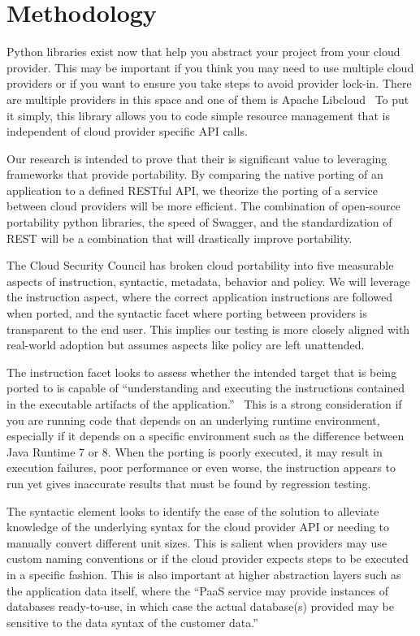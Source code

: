 \section{Methodology}

Python libraries exist now that help you abstract your project from  your cloud provider. 
This may be important if you think you may need to use multiple cloud providers or if you 
want to ensure you take steps to avoid provider lock-in. There are multiple providers in 
this space and one of them is Apache Libcloud~\cite{hid-sp18-518-LibCloud} To put it 
simply, this library allows you to code simple resource  management that is independent 
of cloud provider specific API calls.

Our research is intended to prove that their is significant value to leveraging 
frameworks that provide portability. By comparing the native porting of an application to
a defined RESTful API, we theorize the porting of a service between cloud providers will
be more efficient. The combination of open-source portability python libraries, the speed 
of Swagger, and the standardization of REST will be a combination that will drastically
improve portability.

The Cloud Security Council has broken cloud portability into five measurable aspects of 
instruction, syntactic, metadata, behavior and policy. We will leverage the instruction
aspect, where the correct application instructions are followed when ported, and the 
syntactic facet where porting between providers is transparent to the end user. This
implies our testing is more closely aligned with real-world adoption but assumes aspects
like policy are left unattended.~\cite{hid-sp18-518-Cloud-Council}

The instruction facet looks to assess whether the intended target that is being ported to 
is capable of ``understanding and executing the instructions contained in the executable 
artifacts of the application.''~\cite{hid-sp18-518-Cloud-Council} This is a strong 
consideration if you are running code that depends on an underlying runtime environment, 
especially if it depends on a specific environment such as the difference between Java 
Runtime 7 or 8. When the porting is poorly executed, it may result in execution failures, 
poor performance or even worse, the instruction appears to run yet gives inaccurate 
results that must be found by regression testing.

The syntactic element looks to identify the ease of the solution to alleviate knowledge 
of the underlying syntax for the cloud provider API or needing to manually convert 
different unit sizes. This is salient when providers may use custom naming conventions or 
if the cloud provider expects steps to be executed in a specific fashion. This is also 
important at higher abstraction layers such as the application data itself, where the 
``PaaS service may provide instances of databases ready-to-use, in which
case the actual database(s) provided may be sensitive to the data syntax of the 
customer data.''~\cite{hid-sp18-518-Cloud-Council}

